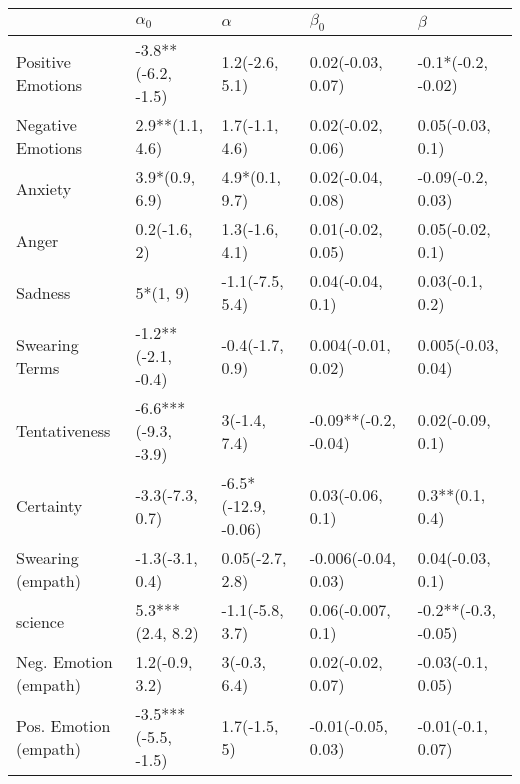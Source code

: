 \begin{tabular}{lllll}
\toprule
{} &           $\alpha_0$ &             $\alpha$ &             $\beta_0$ &              $\beta$ \\
\midrule
Positive Emotions     &   -3.8**(-6.2, -1.5) &       1.2(-2.6, 5.1) &     0.02(-0.03, 0.07) &   -0.1*(-0.2, -0.02) \\
Negative Emotions     &      2.9**(1.1, 4.6) &       1.7(-1.1, 4.6) &     0.02(-0.02, 0.06) &     0.05(-0.03, 0.1) \\
Anxiety               &       3.9*(0.9, 6.9) &       4.9*(0.1, 9.7) &     0.02(-0.04, 0.08) &    -0.09(-0.2, 0.03) \\
Anger                 &         0.2(-1.6, 2) &       1.3(-1.6, 4.1) &     0.01(-0.02, 0.05) &     0.05(-0.02, 0.1) \\
Sadness               &             5*(1, 9) &      -1.1(-7.5, 5.4) &      0.04(-0.04, 0.1) &      0.03(-0.1, 0.2) \\
Swearing Terms        &   -1.2**(-2.1, -0.4) &      -0.4(-1.7, 0.9) &    0.004(-0.01, 0.02) &   0.005(-0.03, 0.04) \\
Tentativeness         &  -6.6***(-9.3, -3.9) &         3(-1.4, 7.4) &  -0.09**(-0.2, -0.04) &     0.02(-0.09, 0.1) \\
Certainty             &      -3.3(-7.3, 0.7) &  -6.5*(-12.9, -0.06) &      0.03(-0.06, 0.1) &      0.3**(0.1, 0.4) \\
Swearing (empath)     &      -1.3(-3.1, 0.4) &      0.05(-2.7, 2.8) &   -0.006(-0.04, 0.03) &     0.04(-0.03, 0.1) \\
science               &     5.3***(2.4, 8.2) &      -1.1(-5.8, 3.7) &     0.06(-0.007, 0.1) &  -0.2**(-0.3, -0.05) \\
Neg. Emotion (empath) &       1.2(-0.9, 3.2) &         3(-0.3, 6.4) &     0.02(-0.02, 0.07) &    -0.03(-0.1, 0.05) \\
Pos. Emotion (empath) &  -3.5***(-5.5, -1.5) &         1.7(-1.5, 5) &    -0.01(-0.05, 0.03) &    -0.01(-0.1, 0.07) \\
\bottomrule
\end{tabular}
